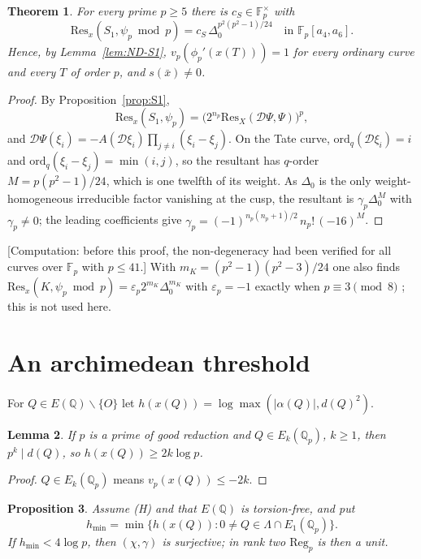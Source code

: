 \documentclass[11pt,a4paper]{amsart}
\newcommand{\Q}{\mathbb{Q}}
\newcommand{\Qp}{\mathbb{Q}_p}
\newcommand{\Fp}{\mathbb{F}_p}
\newcommand{\Reg}{\mathrm{Reg}}
\newcommand{\Lam}{\Lambda}
\theoremstyle{plain}
\newtheorem{theorem}{Theorem}[section]
\newtheorem{lemma}[theorem]{Lemma}
\newtheorem{proposition}[theorem]{Proposition}
\theoremstyle{definition}
\theoremstyle{remark}
\begin{document}
\begin{theorem}\label{thm:ND}
For every prime $p\ge5$ there is $c_S\in\Fp^\times$ with
\[
\mathrm{Res}_x(S_1,\psi_p\bmod p)=c_S\,\Delta_0^{p^2(p^2-1)/24}\quad\text{in }\Fp[a_4,a_6].
\]
Hence, by Lemma~\ref{lem:ND-S1}, $v_p(\phi_p'(x(T)))=1$ for every ordinary curve and every $T$ of order $p$, and $s(\bar x)\ne0$.
\end{theorem}

\begin{proof}
By Proposition~\ref{prop:S1}, \[\mathrm{Res}_x(S_1,\psi_p)=\bigl(2^{n_p}\mathrm{Res}_X(\mathcal D\Psi,\Psi)\bigr)^p,\] and $\mathcal D\Psi(\xi_i)=-A(\mathcal D\xi_i)\prod_{j\ne i}(\xi_i-\xi_j)$. On the Tate curve, $\mathrm{ord}_q(\mathcal D\xi_i)=i$ and $\mathrm{ord}_q(\xi_i-\xi_j)=\min(i,j)$, so the resultant has $q$-order $M=p(p^2-1)/24$, which is one twelfth of its weight. As $\Delta_0$ is the only weight-homogeneous irreducible factor vanishing at the cusp, the resultant is $\gamma_p\Delta_0^M$ with $\gamma_p\ne0$; the leading coefficients give $\gamma_p=(-1)^{n_p(n_p+1)/2}\,n_p!\,(-16)^M$.
\end{proof}

[Computation: before this proof, the non-degeneracy had been verified for all curves over $\Fp$ with $p\le41$.] With $m_K=(p^2-1)(p^2-3)/24$ one also finds $\mathrm{Res}_x(K,\psi_p\bmod p)=\varepsilon_p2^{m_K}\Delta_0^{m_K}$ with $\varepsilon_p=-1$ exactly when $p\equiv3\pmod8$ \cite[Prop.~16]{Draft}; this is not used here.

\section{An archimedean threshold}\label{sec:arch}

For $Q\in E(\Q)\smallsetminus\{O\}$ let $h(x(Q))=\log\max(|\alpha(Q)|,d(Q)^2)$.

\begin{lemma}\label{lem:depthheight}
If $p$ is a prime of good reduction and $Q\in E_k(\Qp)$, $k\ge1$, then $p^k\mid d(Q)$, so $h(x(Q))\ge2k\log p$.
\end{lemma}

\begin{proof}
$Q\in E_k(\Qp)$ means $v_p(x(Q))\le-2k$.
\end{proof}

\begin{proposition}\label{prop:naive}
Assume \textup{(H)} and that $E(\Q)$ is torsion-free, and put \[h_{\min}=\min\{h(x(Q)):0\ne Q\in\Lam\cap E_1(\Qp)\}.\] If $h_{\min}<4\log p$, then $(\chi,\gamma)$ is surjective; in rank two $\Reg_p$ is then a unit.
\end{proposition}
\end{document}
